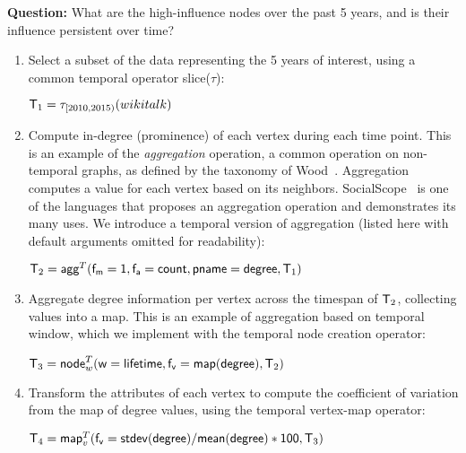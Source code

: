 {\bf Question:} What are the high-influence nodes over the past 5
years, and is their influence persistent over time?

\begin{enumerate}[noitemsep,itemindent=\dimexpr\labelwidth+\labelsep\relax,leftmargin=0pt]
\item Select a subset of the data representing the 5 years of
  interest, using a common temporal operator slice($\tau$):

\begin{center}
\vspace{-0.2cm}
$\mathsf{T}_1 = \tau_{[2010,2015)}(wikitalk)$
\vspace{-0.2cm}
\end{center}

\item Compute in-degree (prominence) of each vertex during each time
  point.  This is an example of the {\em aggregation} operation, a
  common operation on non-temporal graphs, as defined by the taxonomy
  of Wood~\cite{Wood2012}.  Aggregation computes a value for each
  vertex based on its neighbors.  SocialScope~\cite{Amer-Yahia2009} is
  one of the languages that proposes an aggregation operation and
  demonstrates its many uses.  We introduce a temporal version of
  aggregation (listed here with default arguments omitted for
  readability):

\begin{center}
\vspace{-0.2cm}
$\mathsf{T}_2 = \textsf{agg}^T(\mathsf{f_m=1},\mathsf{f_a=count},\mathsf{pname=degree},\mathsf{T}_1)$
\vspace{-0.2cm}
\end{center}

\item Aggregate degree information per vertex across the timespan
  of $\mathsf{T}_2$, collecting values into a map.  This is an example of
  aggregation based on temporal window, which we implement with the
  temporal node creation operator:

\begin{center}
\vspace{-0.2cm}
$\mathsf{T}_3 =\textsf{node}^T_w(\mathsf{w=lifetime},\mathsf{f_v=map(degree)},\mathsf{T}_2)$
\vspace{-0.2cm}
\end{center}

\item Transform the attributes of each vertex to compute the
  coefficient of variation from the map of degree values, using the
  temporal vertex-map operator:

\begin{center}
\vspace{-0.2cm}
$\mathsf{T}_4 = \textsf{map}^T_v(\mathsf{f_v=stdev(degree)/mean(degree)*100}, \mathsf{T}_3)$
\vspace{-0.2cm}
\end{center}

\end{enumerate}

